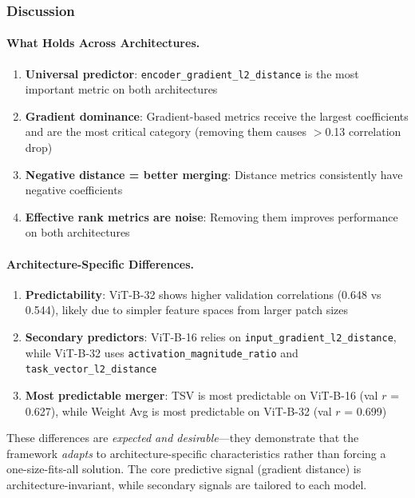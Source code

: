 \subsubsection{Discussion}

\paragraph{What Holds Across Architectures.}
\begin{enumerate}
    \item \textbf{Universal predictor}: \texttt{encoder\_gradient\_l2\_distance} is the most important metric on both architectures
    \item \textbf{Gradient dominance}: Gradient-based metrics receive the largest coefficients and are the most critical category (removing them causes $>$0.13 correlation drop)
    \item \textbf{Negative distance = better merging}: Distance metrics consistently have negative coefficients
    \item \textbf{Effective rank metrics are noise}: Removing them improves performance on both architectures
\end{enumerate}

\paragraph{Architecture-Specific Differences.}
\begin{enumerate}
    \item \textbf{Predictability}: ViT-B-32 shows higher validation correlations (0.648 vs 0.544), likely due to simpler feature spaces from larger patch sizes
    \item \textbf{Secondary predictors}: ViT-B-16 relies on \texttt{input\_gradient\_l2\_distance}, while ViT-B-32 uses \texttt{activation\_magnitude\_ratio} and \texttt{task\_vector\_l2\_distance}
    \item \textbf{Most predictable merger}: TSV is most predictable on ViT-B-16 (val $r$ = 0.627), while Weight Avg is most predictable on ViT-B-32 (val $r$ = 0.699)
\end{enumerate}

These differences are \emph{expected and desirable}---they demonstrate that the framework \emph{adapts} to architecture-specific characteristics rather than forcing a one-size-fits-all solution. The core predictive signal (gradient distance) is architecture-invariant, while secondary signals are tailored to each model.

